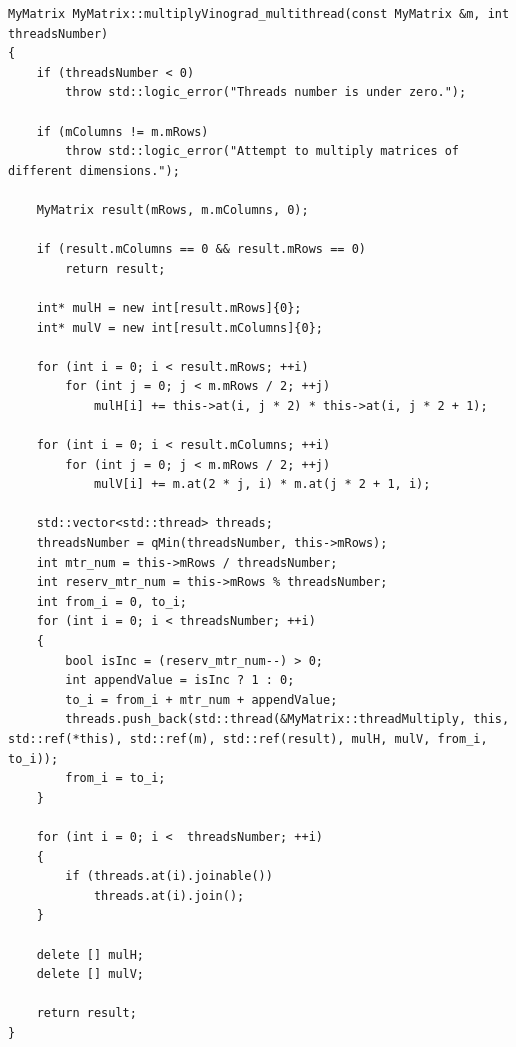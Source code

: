 \documentclass[a4paper,14pt]{report}
\begin{document}
\begin{lstlisting}[label=some-code,caption=Параллельный алгорим Винограда]
MyMatrix MyMatrix::multiplyVinograd_multithread(const MyMatrix &m, int threadsNumber)
{
    if (threadsNumber < 0)
        throw std::logic_error("Threads number is under zero.");

    if (mColumns != m.mRows)
        throw std::logic_error("Attempt to multiply matrices of different dimensions.");

    MyMatrix result(mRows, m.mColumns, 0);

    if (result.mColumns == 0 && result.mRows == 0)
        return result;

    int* mulH = new int[result.mRows]{0};
    int* mulV = new int[result.mColumns]{0};

    for (int i = 0; i < result.mRows; ++i)
        for (int j = 0; j < m.mRows / 2; ++j)
            mulH[i] += this->at(i, j * 2) * this->at(i, j * 2 + 1);

    for (int i = 0; i < result.mColumns; ++i)
        for (int j = 0; j < m.mRows / 2; ++j)
            mulV[i] += m.at(2 * j, i) * m.at(j * 2 + 1, i);

    std::vector<std::thread> threads;
    threadsNumber = qMin(threadsNumber, this->mRows);
    int mtr_num = this->mRows / threadsNumber;
    int reserv_mtr_num = this->mRows % threadsNumber;
    int from_i = 0, to_i;
    for (int i = 0; i < threadsNumber; ++i)
    {
        bool isInc = (reserv_mtr_num--) > 0;
        int appendValue = isInc ? 1 : 0;
        to_i = from_i + mtr_num + appendValue;
        threads.push_back(std::thread(&MyMatrix::threadMultiply, this, std::ref(*this), std::ref(m), std::ref(result), mulH, mulV, from_i, to_i));
        from_i = to_i;
    }

    for (int i = 0; i <  threadsNumber; ++i)
    {
        if (threads.at(i).joinable())
            threads.at(i).join();
    }

    delete [] mulH;
    delete [] mulV;

    return result;
}
\end{lstlisting}
\end{document}
